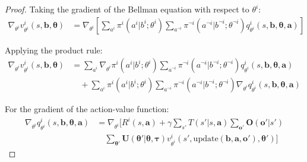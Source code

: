 \documentclass[a4paper,12pt]{report}
\begin{document}
\begin{proof}
    Taking the gradient of the Bellman equation with respect to $\theta^{i}$:
    \begin{align}
        \nabla_{\theta^i}v^{i}_{\theta^i}(s, \boldsymbol{b}, \boldsymbol{\theta}) & = \nabla_{\theta^i}\left[ \sum_{a^i}\pi^{i}(a^{i}|b^{i}; \theta^{i}) \sum_{a^{\neg i}}\pi^{\neg i}(a^{\neg i}|b^{\neg i}; \theta^{\neg i}) q^{i}_{\theta^i}(s, \boldsymbol{b}, \boldsymbol{\theta}, \boldsymbol{a}) \right]
    \end{align}

    Applying the product rule:
    \begin{align}
        \nabla_{\theta^i}v^{i}_{\theta^i}(s, \boldsymbol{b}, \boldsymbol{\theta}) & = \sum_{a^i}\nabla_{\theta^i}\pi^{i}(a^{i}|b^{i}; \theta^{i}) \sum_{a^{\neg i}}\pi^{\neg i}(a^{\neg i}|b^{\neg i}; \theta^{\neg i}) q^{i}_{\theta^i}(s, \boldsymbol{b}, \boldsymbol{\theta}, \boldsymbol{a}) \nonumber \\
                                                                                  & \quad + \sum_{a^i}\pi^{i}(a^{i}|b^{i}; \theta^{i}) \sum_{a^{\neg i}}\pi^{\neg i}(a^{\neg i}|b^{\neg i}; \theta^{\neg i}) \nabla_{\theta^i}q^{i}_{\theta^i}(s, \boldsymbol{b}, \boldsymbol{\theta}, \boldsymbol{a})
    \end{align}

    For the gradient of the action-value function:
    \begin{align}
        \nabla_{\theta^i}q^{i}_{\theta^i}(s, \boldsymbol{b}, \boldsymbol{\theta}, \boldsymbol{a}) & = \nabla_{\theta^i}\Bigg[ R^{i}(s, \boldsymbol{a}) + \gamma \sum_{s'}T(s'|s, \boldsymbol{a}) \sum_{\boldsymbol{o}'}\boldsymbol{O}(\boldsymbol{o}'|s') \nonumber                                                                \\
                                                                                                  & \quad \sum_{\boldsymbol{\theta}'}\boldsymbol{U}(\boldsymbol{\theta}'|\boldsymbol{\theta}, \boldsymbol{\tau}) v^{i}_{\theta^i}(s', \text{update}(\boldsymbol{b}, \boldsymbol{a}, \boldsymbol{o}'), \boldsymbol{\theta}') \Bigg]
    \end{align}


\end{proof}
\end{document}
